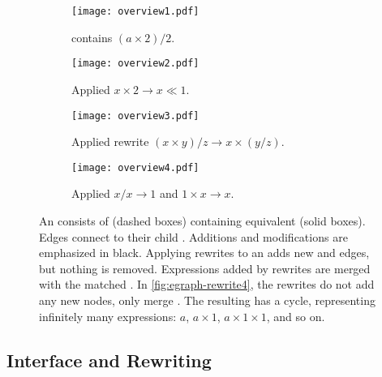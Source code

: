 \begin{figure}
  \begin{subfigure}[t]{0.175\linewidth}
    \centering
    \texttt{[image: overview1.pdf]}
    \caption{\Egraph contains ${(a \times 2) / 2}$.}
    \label{fig:egraph-rewrite1}
  \end{subfigure}
  \hfill
  \begin{subfigure}[t]{0.23\linewidth}
    \centering
    \texttt{[image: overview2.pdf]}
    \caption{
      Applied ${x \times 2 \to x \ll 1}$.
    }
    \label{fig:egraph-rewrite2}
  \end{subfigure}
  \hfill
  \begin{subfigure}[t]{0.23\linewidth}
    \centering
    \texttt{[image: overview3.pdf]}
    \caption{
      Applied rewrite ${(x \times y) / z \to x \times (y / z)}$.
    }
    \label{fig:egraph-rewrite3}
  \end{subfigure}
  \hfill
  \begin{subfigure}[t]{0.24\linewidth}
    \centering
    \texttt{[image: overview4.pdf]}
    \caption{
      Applied ${x / x \to 1}$ and ${1 \times x \to x}$.
    }
    \label{fig:egraph-rewrite4}
  \end{subfigure}
  \caption{
    An \egraph consists of \eclasses (dashed boxes) containing
      equivalent \enodes (solid boxes).
    Edges connect \enodes to their child \eclasses.
    Additions and modifications are emphasized in black.
    Applying rewrites to an \egraph adds new \enodes and edges,
      but nothing is removed.
    Expressions added by rewrites are merged with the matched \eclass.
    In \autoref{fig:egraph-rewrite4}, the rewrites do not add any new nodes,
      only merge \eclasses.
    The resulting \egraph has a cycle,
      representing infinitely many expressions:
      $a$, $a \times 1$, $a \times 1 \times 1$, and so on.
  }
  \label{fig:egraph-rewrite}
\end{figure}

\subsection{Interface and Rewriting}
\label{sec:interface}

